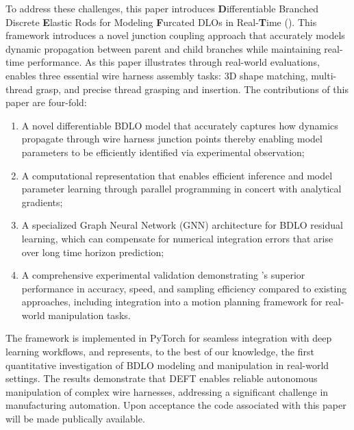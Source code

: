 To address these challenges, this paper introduces \textbf{D}ifferentiable Branched Discrete \textbf{E}lastic Rods for Modeling \textbf{F}urcated DLOs in Real-\textbf{T}ime (\DEFT). 
This framework introduces a novel junction coupling approach that accurately models dynamic propagation between parent and child branches while maintaining real-time performance. 
As this paper illustrates through real-world evaluations, \DEFTn enables three essential wire harness assembly tasks: 3D shape matching, multi-thread grasp, and precise thread grasping and insertion. 
The contributions of this paper are four-fold:
\begin{enumerate}
\item A novel differentiable BDLO model that accurately captures how dynamics propagate through wire harness junction points thereby enabling model parameters to be efficiently identified via experimental observation;
\item A computational representation that enables efficient inference and model parameter learning through parallel programming in concert with analytical gradients;
\item A specialized Graph Neural Network (GNN) architecture for BDLO residual learning, which can compensate for numerical integration errors that arise over long time horizon prediction;
\item A comprehensive experimental validation demonstrating \DEFT's superior performance in accuracy, speed, and sampling efficiency compared to existing approaches, including integration into a motion planning framework for real-world manipulation tasks.
\end{enumerate}
The framework is implemented in PyTorch for seamless integration with deep learning workflows, and represents, to the best of our knowledge, the first quantitative investigation of BDLO modeling and manipulation in real-world settings. 
The results demonstrate that DEFT enables reliable autonomous manipulation of complex wire harnesses, addressing a significant challenge in manufacturing automation.
Upon acceptance the code associated with this paper will be made publically available.
